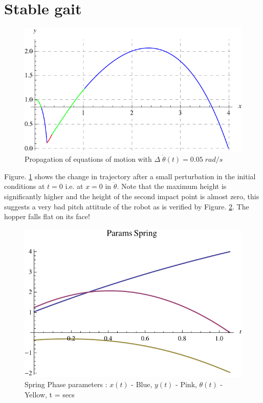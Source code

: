\section{Stable gait}
\begin{figure}[H]
\centering
\includegraphics[scale=0.8]{fig/plot_perturb.pdf}
\caption{Propagation of equations of motion with $\Delta\;\dot{\theta}(t) = 0.05\;rad/s$}
\label{fig:4_eqn_perturb}
\end{figure}
Figure. \ref{fig:4_eqn_perturb} shows the change in trajectory after a small perturbation in the initial 
conditions at $t = 0$ i.e. at $x = 0$ in $\dot{\theta}$. Note that the maximum height is significantly 
higher and the height of the second impact point is almost zero, this suggests a very bad pitch attitude 
of the robot as is verified by Figure. \ref{fig:4_spring_params_perturb}. The hopper falls flat on its 
face!
\begin{figure}[!htp]
\centering
\includegraphics[scale=0.8]{fig/pSpringParams_perturb.pdf}
\caption{Spring Phase parameters : $x(t)$ - Blue, $y(t)$ - Pink, $\theta(t)$ - Yellow, t = secs}
\label{fig:4_spring_params_perturb}
\end{figure}
